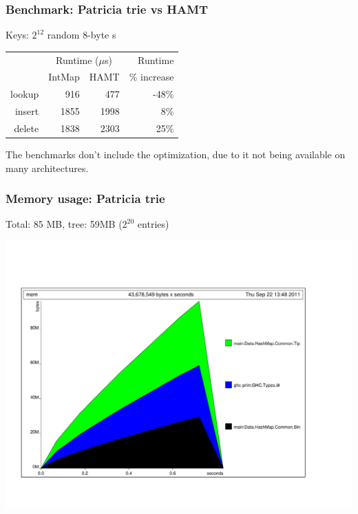 \documentclass[xetex,mathserif,serif]{beamer}
\newcommand{\code}[1]{\mbox{\texttt{\small{\color{CodeColor}{#1}}}}}
\begin{document}
\begin{frame}
  \frametitle{Benchmark: Patricia trie vs HAMT}

  Keys: $2^{12}$ random 8-byte \code{ByteString}s

  \bigskip
  \begin{center}
  \begin{tabular}{r|rrr}
                  & \multicolumn{2}{c}{Runtime ($\mu$s)} & Runtime \\
                  & IntMap & HAMT                      & \% increase \\
    \hline lookup &  916 &  477 & -48\% \\
           insert & 1855 & 1998 & 8\% \\
           delete & 1838 & 2303 & 25\% \\
  \end{tabular}
  \end{center}

  The benchmarks don't include the \code{POPCNT} optimization, due to
  it not being available on many architectures.
\end{frame}

\begin{frame}
  \frametitle{Memory usage: Patricia trie}
  Total: 85 MB, tree: 59MB ($2^{20}$ \code{Int} entries)
  \begin{center}
  \includegraphics[angle=90,scale=0.3]{patricia-mem.pdf}
  \end{center}
\end{frame}
\end{document}
